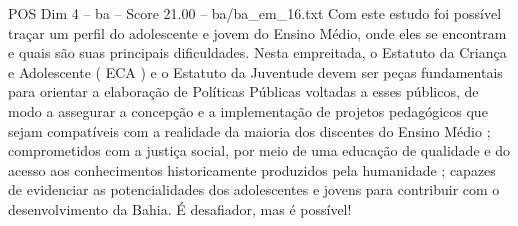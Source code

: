 \begin{textsample}{POS Dim 4 – ba – Score 21.00 – ba/ba\_em\_16.txt}
Com este estudo foi possível traçar um perfil do adolescente e jovem do Ensino Médio, onde eles se encontram e quais são suas principais dificuldades.
Nesta empreitada, o Estatuto da Criança e Adolescente ( ECA ) e o Estatuto da Juventude devem ser peças fundamentais para orientar a elaboração de Políticas Públicas voltadas a esses públicos, de modo a assegurar a concepção e a implementação de projetos pedagógicos que sejam compatíveis com a realidade da maioria dos discentes do Ensino Médio ; comprometidos com a justiça social, por meio de uma educação de qualidade e do acesso aos conhecimentos historicamente produzidos pela humanidade ; capazes de evidenciar as potencialidades dos adolescentes e jovens para contribuir com o desenvolvimento da Bahia.
É desafiador, mas é possível!

\end{textsample}
